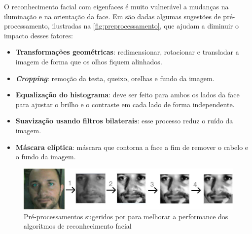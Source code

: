O reconhecimento facial com eigenfaces é muito vulnerável a mudanças na iluminação e na orientação da face. Em \cite{baggio2012mastering} são dadas algumas sugestões de pré-processamento, ilustradas na \autoref{fig:preprocessamento}, que ajudam a diminuir o impacto desses fatores:
%
\begin{itemize}
    \item \textbf{Transformações geométricas}: redimensionar, rotacionar e transladar a imagem de forma que os olhos fiquem alinhados.
    
    \item \textit{\textbf{Cropping}}: remoção da testa, queixo, orelhas e fundo da imagem.
    
    \item \textbf{Equalização do histograma}: deve ser feito para ambos os lados da face para ajustar o brilho e o contraste em cada lado de forma independente.
    
    \item \textbf{Suavização usando filtros bilaterais}: esse processo reduz o ruído da imagem.
    
    \item \textbf{Máscara elíptica}: máscara que contorna a face a fim de remover o cabelo e o fundo da imagem.
\end{itemize}

\begin{figure}[ht]
    \centering
    \caption[Pré-processamentos para melhorar reconhecimento]{Pré-processamentos sugeridos por  para melhorar a performance dos algoritmos de reconhecimento facial}
    \label{fig:preprocessamento}
    \includegraphics[width=0.95\linewidth]{imagens/preprocessamento.png}
\end{figure}

